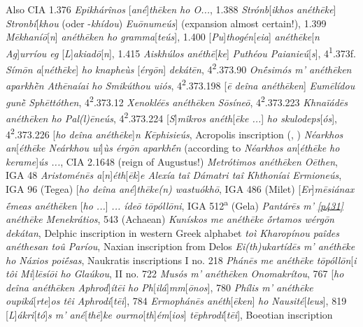 Also CIA 1.376 \textit{Epikhárînos} {[}\textit{\emph{ané}}{]}\textit{\emph{thēken} ho O...}, 1.388 \textit{Strónb}{[}\textit{ikhos \emph{anéthēke}}{]} \textit{Stronbí}{[}\textit{khou} (oder -\textit{khídou}) \textit{Euōnumeús}{]} (expansion almost certain!), 1.399 \textit{Mē\-kha\-níō}{[}\textit{n}{]} \textit{\emph{anéthēken} ho gramma}{[}\textit{teús}{]}, 1.400 {[}\textit{Pu}{]}\textit{thogén}{[}\textit{eia}{]} \textit{\emph{anéthēke}}{[}\textit{\emph{n} Ag}{]}\textit{ur\-ríou eg} {[}\textit{L}{]}\textit{akiadō}{[}\textit{n}{]}, 1.415 \textit{Aiskhúlos \emph{anéthē}}{[}\textit{\emph{ke}}{]} \textit{Puthéou Paianieú}{[}\textit{s}{]}, 4\textsuperscript{1}.373f. \textit{Sí\-mōn \emph{a}}{[}\textit{\emph{néthēke}}{]} \textit{ho knapheùs }{[}\textit{érgōn}{]} \textit{dekátēn}, 4\textsuperscript{2}.373.90 \textit{Onḗsimós m' \emph{anéthēken} aparkhḕn Athēnaíai ho Smikúthou uiós}, 4\textsuperscript{2}.373.198 {[}\textit{ē deîna \emph{anéthēken}}{]} \textit{Eumēlídou gunḕ Sphēttóthen}, 4\textsuperscript{2}.373.12 \textit{Xenokléēs \emph{anéthēken} Sōsíneō}, 4\textsuperscript{2}.373.223 \textit{Khnaïádēs \emph{anéthēken} ho Pal(l)ēneús}, 4\textsuperscript{2}.373.224 {[}\textit{S}{]}\textit{mîkros \emph{anéth}}{[}\textit{\emph{ēke} ...}{]} \textit{ho skulodeps}{[}\textit{ós}{]}, 4\textsuperscript{2}.373.226 {[}\textit{ho deîna \emph{anéthēke}}{]}\textit{\emph{n} Kēphisieús}, Acropolis inscription (\citealp{Kabbadias1886}, \citealp[135]{Studniczka1887}) \textit{Néarkhos \emph{an}}{[}\textit{\emph{éthēke} Neárkhou ui}{]}\textit{ùs érgōn aparkhḗn} (according to \citealp{Robert1887} \textit{Néarkhos \emph{an}}{[}\textit{\emph{éthēke} ho kerame}{]}\textit{ús ...}, CIA 2.1648 (reign of Augustus!) \textit{Metrótimos \emph{anéthēken} Oēthen}, IGA 48 \textit{Aristoménēs \emph{a}}{[}\textit{\emph{n}}{]}\textit{\emph{éth}}{[}\textit{\emph{ēk}}{]}\textit{\emph{e} Alexía taî Dámatri taî Khthoníai Ermioneús}, IGA 96 (Tegea) {[}\textit{ho deîna \emph{ané}}{]}\textit{\emph{thēke(n)} was\-tuókhō}, IGA 486 (Milet) {[}\textit{Er}{]}\textit{mēsiánax ḗmeas \emph{anéthēken}} {[}\textit{ho ...}{]} \textit{... ídeō tōpóllōni}, IGA 512\textsuperscript{a} (Gela) \textit{Pantárēs m'} \hyperlink{p431}{\emph{[p431]}} \textit{\emph{anéthēke} Menekrátios}, 543 (Achaean) \textit{Kunískos me \emph{anéthēke} ṓrtamos wérgōn dekátan}, Delphic inscription in western Greek alphabet \citep[445]{Haussoullier1882} \textit{toì Kharopínou paîdes \emph{anéthesan} toû Paríou}, Naxian inscription from Delos \citep[464f.]{Homolle1888} \textit{Ei(th)ukartídēs m' \emph{anéthēke} ho Náxios poiḗsas}, Naukratis inscriptions I no. 218 \textit{Phánēs me \emph{anéthēke} tōpóllōn}{[}\textit{i tôi Mi}{]}\textit{lēsíōi ho Glaúkou}, II no. 722 \textit{Musós m' \emph{anéthēken} Onomakrítou}, 767 {[}\textit{ho deîna \emph{anéthēken} Aphrod}{]}\textit{ítēi ho Ph}{[}\textit{ilá}{]}\textit{mm}{[}\textit{ōnos}{]}, 780 \textit{Phílis m' \emph{anéthēke} oupiká}{[}\textit{rte}{]}\textit{os têi Aphrodí}{[}\textit{tēi}{]}, 784 \textit{Ermophánēs \emph{anéth}}{[}\textit{\emph{ēken}}{]} \textit{ho Nausité}{[}\textit{leus}{]}, 819 {[}\textit{L}{]}\textit{ákri}{[}\textit{tó}{]}\textit{s m' \emph{ané}}{[}\textit{\emph{thē}}{]}\textit{\emph{ke} ourmo}{[}\textit{th}{]}\textit{ém}{[}\textit{ios}{]}\textit{ tēphrodí}{[}\textit{tēi}{]}, Boeotian inscription 